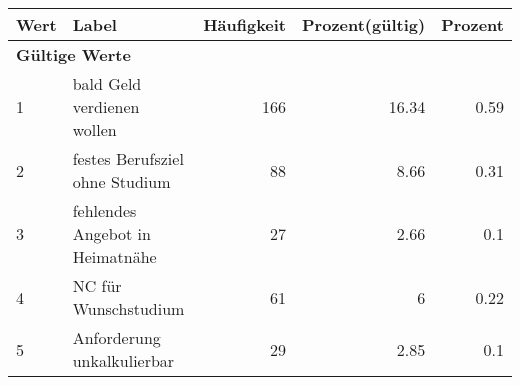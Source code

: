      \begin{longtable}{lXrrr}
     \toprule
     \textbf{Wert} & \textbf{Label} & \textbf{Häufigkeit} & \textbf{Prozent(gültig)} & \textbf{Prozent} \\
     \endhead
     \midrule
     \multicolumn{5}{l}{\textbf{Gültige Werte}}\\

     1 &
     \multicolumn{1}{X}{ bald Geld verdienen wollen   } &


       \num{166} &
       \num[round-mode=places,round-precision=2]{16.34} &
         \num[round-mode=places,round-precision=2]{0.59} \\

     2 &
     \multicolumn{1}{X}{ festes Berufsziel ohne Studium   } &


       \num{88} &
       \num[round-mode=places,round-precision=2]{8.66} &
         \num[round-mode=places,round-precision=2]{0.31} \\

     3 &
     \multicolumn{1}{X}{ fehlendes Angebot in Heimatnähe   } &


       \num{27} &
       \num[round-mode=places,round-precision=2]{2.66} &
         \num[round-mode=places,round-precision=2]{0.1} \\

     4 &
     \multicolumn{1}{X}{ NC für Wunschstudium   } &


       \num{61} &
       \num[round-mode=places,round-precision=2]{6} &
         \num[round-mode=places,round-precision=2]{0.22} \\

     5 &
     \multicolumn{1}{X}{ Anforderung unkalkulierbar   } &


       \num{29} &
       \num[round-mode=places,round-precision=2]{2.85} &
         \num[round-mode=places,round-precision=2]{0.1} \\


\end{longtable}
